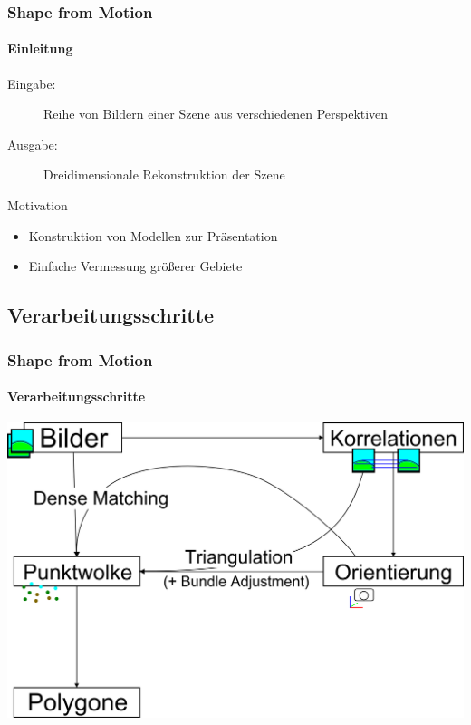 \documentclass{beamer}
\begin{document}
\begin{frame}
	\frametitle{Shape from Motion}
	\framesubtitle{Einleitung}

	\begin{description}
		\item[Eingabe:] Reihe von Bildern einer Szene aus verschiedenen Perspektiven
		\item[Ausgabe:] Dreidimensionale Rekonstruktion der Szene
	\end{description}

	\begin{block}{Motivation}
		\begin{itemize}
			\item Konstruktion von Modellen zur Präsentation
			\item Einfache Vermessung größerer Gebiete
		\end{itemize}
	\end{block}
\end{frame}


\subsection{Verarbeitungsschritte}
\begin{frame}
	\frametitle{Shape from Motion}
	\framesubtitle{Verarbeitungsschritte}

	\includegraphics[width=\linewidth]{includes/shape-from-motion_process}
\end{frame}
\end{document}
